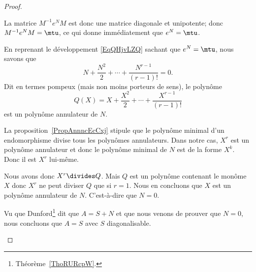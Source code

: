 \begin{proof}
\begin{subproof}
		La matrice \( M^{-1}e^NM\) est donc une matrice diagonale et unipotente; donc \( M^{-1}e^NM=\mtu\), ce qui donne immédiatement que \( e^N=\mtu\).


		En reprenant le développement \eqref{EqQHjvLZQ} sachant que \( e^N=\mtu\), nous savons que
		\begin{equation}
			N+\frac{ N^2 }{2}+\cdots +\frac{ N^{r-1} }{ (r-1)! }=0.
		\end{equation}
		Dit en termes pompeux (mais non moins porteurs de sens), le polynôme
		\begin{equation}
			Q(X)=X+\frac{ X^2 }{2}+\cdots +\frac{ X^{r-1} }{ (r-1)! }
		\end{equation}
		est un polynôme annulateur de \( N\).

		La proposition~\ref{PropAnnncEcCxj} stipule que le polynôme minimal d'un endomorphisme divise tous les polynômes annulateurs. Dans notre cas, \( X^r\) est un polynôme annulateur et donc le polynôme minimal de \( N\) est de la forme \( X^k\). Donc il est \( X^r\) lui-même.

		Nous avons donc \( X^r\divides Q\). Mais \( Q\) est un polynôme contenant le monôme \( X\) donc \( X^r\) ne peut diviser \( Q\) que si \( r=1\). Nous en concluons que \( X\) est un polynôme annulateur de \( N\). C'est-à-dire que \( N=0\).

		\spitem[Conclusion]

		Vu que Dunford\footnote{Théorème~\ref{ThoRURcpW}.} dit que \( A=S+N\) et que nous venons de prouver que \( N=0\), nous concluons que \( A=S\) avec \( S\) diagonalisable.

	\end{subproof}
\end{proof}

